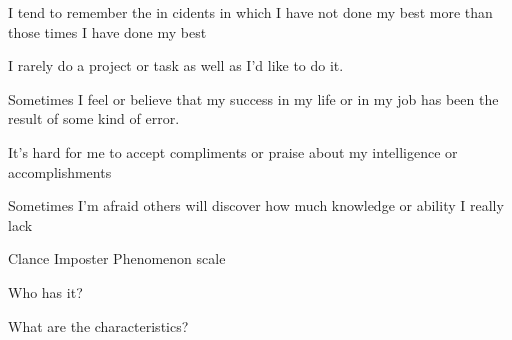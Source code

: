 \documentclass[aspectratio=169]{beamer}
\begin{document}
\begin{frame}
  \begin{center}
    \Huge I tend to remember the in
    cidents in which I have not done my best more than those times I have done my best
  \end{center}
\end{frame}

\begin{frame}
  \begin{center}
    \Huge  I rarely do a project or task as well as I’d like to do it.
  \end{center}
\end{frame}

\begin{frame}
  \begin{center}
    \Huge  Sometimes I feel or believe that my success in my life or in my job has been the result of some kind of error.
  \end{center}
\end{frame}

\begin{frame}
  \begin{center}
    \Huge    It’s  hard  for  me  to  accept  compliments  or  praise  about  my  intelligence  or  accomplishments
  \end{center}
\end{frame}

\begin{frame}
  \begin{center}
    \Huge   Sometimes I’m afraid others will discover how much knowledge or ability I really lack
  \end{center}
\end{frame}

\begin{frame}
  \begin{center}
    \Huge Clance Imposter Phenomenon scale
  \end{center}
\end{frame}

\begin{frame}
  \begin{center}
    \Huge Who has it?
  \end{center}
\end{frame}

\begin{frame}
  \begin{center}
    \Huge What are the characteristics?
  \end{center}
\end{frame}
\end{document}
